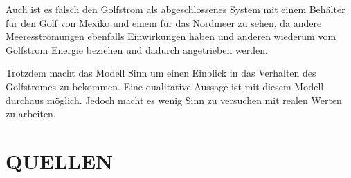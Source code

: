 \documentclass[a4paper,twoside]{article}
\begin{document}
	Auch ist es falsch den Golfstrom als abgeschlossenes System mit einem Behälter für den Golf von Mexiko und einem für das Nordmeer zu sehen, da andere Meeresströmungen ebenfalls Einwirkungen haben und anderen wiederum vom Golfstrom Energie beziehen und dadurch angetrieben werden.
	
	Trotzdem macht das Modell Sinn um einen Einblick in das Verhalten des Golfstromes zu bekommen. Eine qualitative Aussage ist mit diesem Modell durchaus möglich. Jedoch macht es wenig Sinn zu versuchen mit realen Werten zu arbeiten. 
	
 	\section{\uppercase{Quellen}}\label{sec: Quellen}		

	\nocite{*}
	
	
\end{document}
